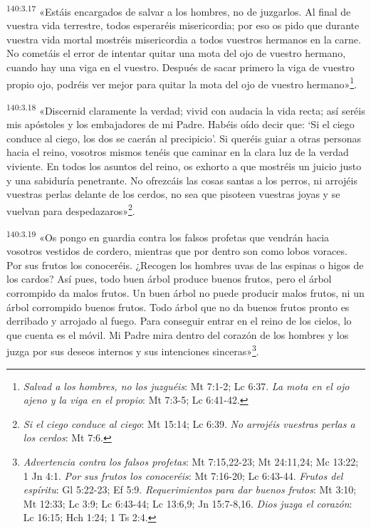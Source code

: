 \par
\textsuperscript{140:3.17} «Estáis encargados de salvar a los hombres, no de juzgarlos. Al final de vuestra vida terrestre, todos esperaréis misericordia; por eso os pido que durante vuestra vida mortal mostréis misericordia a todos vuestros hermanos en la carne. No cometáis el error de intentar quitar una mota del ojo de vuestro hermano, cuando hay una viga en el vuestro. Después de sacar primero la viga de vuestro propio ojo, podréis ver mejor para quitar la mota del ojo de vuestro hermano»\footnote{\textit{Salvad a los hombres, no los juzguéis}: Mt 7:1-2; Lc 6:37. \textit{La mota en el ojo ajeno y la viga en el propio}: Mt 7:3-5; Lc 6:41-42.}.

\par
\textsuperscript{140:3.18} «Discernid claramente la verdad; vivid con audacia la vida recta; así seréis mis apóstoles y los embajadores de mi Padre. Habéis oído decir que: `Si el ciego conduce al ciego, los dos se caerán al precipicio'. Si queréis guiar a otras personas hacia el reino, vosotros mismos tenéis que caminar en la clara luz de la verdad viviente. En todos los asuntos del reino, os exhorto a que mostréis un juicio justo y una sabiduría penetrante. No ofrezcáis las cosas santas a los perros, ni arrojéis vuestras perlas delante de los cerdos, no sea que pisoteen vuestras joyas y se vuelvan para despedazaros»\footnote{\textit{Si el ciego conduce al ciego}: Mt 15:14; Lc 6:39. \textit{No arrojéis vuestras perlas a los cerdos}: Mt 7:6.}.

\par
\textsuperscript{140:3.19} «Os pongo en guardia contra los falsos profetas que vendrán hacia vosotros vestidos de cordero, mientras que por dentro son como lobos voraces. Por sus frutos los conoceréis. ¿Recogen los hombres uvas de las espinas o higos de los cardos? Así pues, todo buen árbol produce buenos frutos, pero el árbol corrompido da malos frutos. Un buen árbol no puede producir malos frutos, ni un árbol corrompido buenos frutos. Todo árbol que no da buenos frutos pronto es derribado y arrojado al fuego. Para conseguir entrar en el reino de los cielos, lo que cuenta es el móvil. Mi Padre mira dentro del corazón de los hombres y los juzga por sus deseos internos y sus intenciones sinceras»\footnote{\textit{Advertencia contra los falsos profetas}: Mt 7:15,22-23; Mt 24:11,24; Mc 13:22; 1 Jn 4:1. \textit{Por sus frutos los conoceréis}: Mt 7:16-20; Lc 6:43-44. \textit{Frutos del espíritu}: Gl 5:22-23; Ef 5:9. \textit{Requerimientos para dar buenos frutos}: Mt 3:10; Mt 12:33; Lc 3:9; Lc 6:43-44; Lc 13:6,9; Jn 15:7-8,16. \textit{Dios juzga el corazón}: Lc 16:15; Hch 1:24; 1 Ts 2:4.}.

